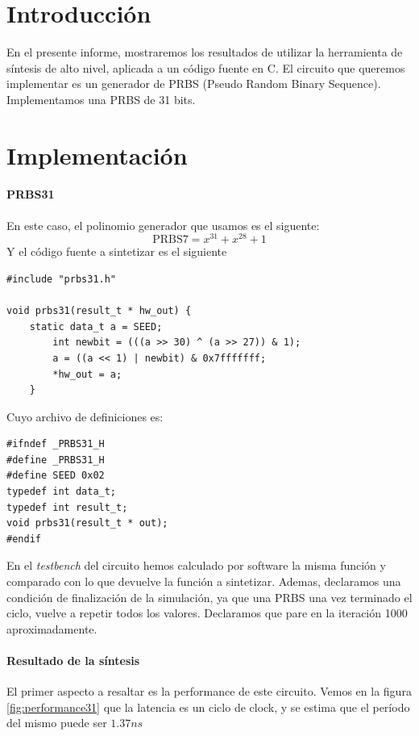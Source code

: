 
\everymath{\displaystyle} %


\section{Introducción}
En el presente informe, mostraremos los resultados de utilizar la herramienta de síntesis de alto nivel, aplicada a un código fuente en C. El circuito que queremos implementar es un generador de PRBS (Pseudo Random Binary Sequence). Implementamos una PRBS de 31 bits.

\section{Implementación}
\paragraph{PRBS31}
En este caso, el polinomio generador que usamos es el siguente:
\begin{equation*}
\mbox{PRBS7} = x^{31} + x^{28} + 1
\end{equation*}
Y el código fuente a sintetizar es el siguiente
\begin{lstlisting}
#include "prbs31.h"

void prbs31(result_t * hw_out) {
    static data_t a = SEED;
        int newbit = (((a >> 30) ^ (a >> 27)) & 1);
        a = ((a << 1) | newbit) & 0x7fffffff;
        *hw_out = a;
    }
\end{lstlisting}
Cuyo archivo de definiciones es:
\begin{lstlisting}
#ifndef _PRBS31_H
#define _PRBS31_H
#define SEED 0x02
typedef int data_t;
typedef int result_t;
void prbs31(result_t * out);
#endif
\end{lstlisting}

En el \emph{testbench} del circuito hemos calculado por software la misma función y comparado con lo que devuelve la función a sintetizar. Ademas, declaramos una condición de finalización de la simulación, ya que una PRBS una vez terminado el ciclo, vuelve a repetir todos los valores. Declaramos que pare en la iteración 1000 aproximadamente.

\paragraph{Resultado de la síntesis} El primer aspecto a resaltar es la performance de este circuito. Vemos en la figura \ref{fig:performance31} que la latencia es un ciclo de clock, y se estima que el período del mismo puede ser $1.37ns$

